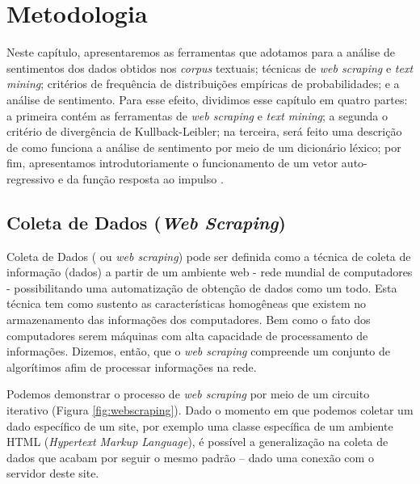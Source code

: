 \chapter{Metodologia} \label{metodologia}

Neste capítulo, apresentaremos as ferramentas que adotamos para a análise de sentimentos dos dados obtidos nos \textit{corpus} textuais; técnicas de \textit{web scraping} e \textit{text mining}; critérios de frequência de distribuições empíricas de probabilidades; e a análise de sentimento. Para esse efeito, dividimos esse capítulo em quatro partes: a primeira contém as ferramentas de \textit{web scraping} e \textit{text mining}; a segunda o critério de divergência de Kullback-Leibler; na terceira, será feito uma descrição de como funciona a análise de sentimento por meio de um dicionário léxico; por fim, apresentamos introdutoriamente o funcionamento de um vetor auto-regressivo e da função resposta ao impulso . 

\section{Coleta de Dados (\textit{Web Scraping})}

Coleta de Dados ( ou \textit{web scraping}) pode ser definida como a técnica de coleta de informação (dados) a partir de um ambiente web - rede mundial de computadores - possibilitando uma automatização de obtenção de dados como um todo. Esta técnica tem como sustento as características homogêneas que existem no armazenamento das informações dos computadores. Bem como o fato dos computadores serem máquinas  com alta capacidade de processamento de informações. 
Dizemos, então, que o \textit{web scraping} compreende um conjunto de algorítimos afim de processar informações na rede.

Podemos demonstrar o processo de \textit{web scraping} por meio de um circuito iterativo (Figura \ref{fig:webscraping}). Dado o momento em que podemos coletar um dado específico de um site, por exemplo uma classe específica de um ambiente HTML (\textit{Hypertext Markup Language}), é possível a generalização na coleta de dados que acabam por seguir o mesmo padrão -- dado uma conexão com o servidor deste site.  

